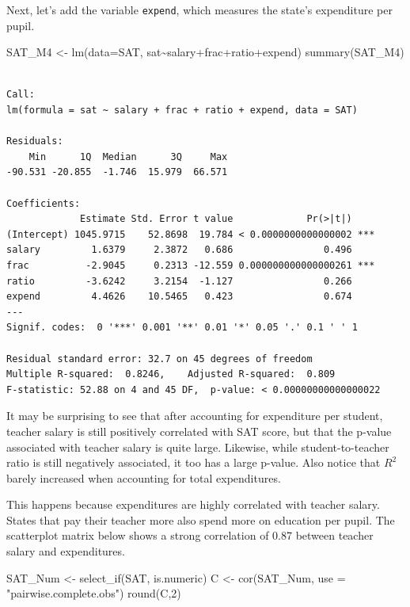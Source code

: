 \documentclass[
  letterpaper,
  DIV=11,
  numbers=noendperiod]{scrreprt}
\newenvironment{Shaded}{\begin{snugshade}}{\end{snugshade}}
\newcommand{\AttributeTok}[1]{\textcolor[rgb]{0.40,0.45,0.13}{#1}}
\newcommand{\DecValTok}[1]{\textcolor[rgb]{0.68,0.00,0.00}{#1}}
\newcommand{\FunctionTok}[1]{\textcolor[rgb]{0.28,0.35,0.67}{#1}}
\newcommand{\NormalTok}[1]{\textcolor[rgb]{0.00,0.23,0.31}{#1}}
\newcommand{\OtherTok}[1]{\textcolor[rgb]{0.00,0.23,0.31}{#1}}
\newcommand{\SpecialCharTok}[1]{\textcolor[rgb]{0.37,0.37,0.37}{#1}}
\newcommand{\StringTok}[1]{\textcolor[rgb]{0.13,0.47,0.30}{#1}}
\begin{document}
Next, let's add the variable \texttt{expend}, which measures the state's
expenditure per pupil.

\begin{Shaded}
\begin{Highlighting}[]
\NormalTok{SAT\_M4 }\OtherTok{\textless{}{-}} \FunctionTok{lm}\NormalTok{(}\AttributeTok{data=}\NormalTok{SAT, sat}\SpecialCharTok{\textasciitilde{}}\NormalTok{salary}\SpecialCharTok{+}\NormalTok{frac}\SpecialCharTok{+}\NormalTok{ratio}\SpecialCharTok{+}\NormalTok{expend)}
\FunctionTok{summary}\NormalTok{(SAT\_M4)}
\end{Highlighting}
\end{Shaded}

\begin{verbatim}

Call:
lm(formula = sat ~ salary + frac + ratio + expend, data = SAT)

Residuals:
    Min      1Q  Median      3Q     Max 
-90.531 -20.855  -1.746  15.979  66.571 

Coefficients:
             Estimate Std. Error t value             Pr(>|t|)    
(Intercept) 1045.9715    52.8698  19.784 < 0.0000000000000002 ***
salary         1.6379     2.3872   0.686                0.496    
frac          -2.9045     0.2313 -12.559 0.000000000000000261 ***
ratio         -3.6242     3.2154  -1.127                0.266    
expend         4.4626    10.5465   0.423                0.674    
---
Signif. codes:  0 '***' 0.001 '**' 0.01 '*' 0.05 '.' 0.1 ' ' 1

Residual standard error: 32.7 on 45 degrees of freedom
Multiple R-squared:  0.8246,    Adjusted R-squared:  0.809 
F-statistic: 52.88 on 4 and 45 DF,  p-value: < 0.00000000000000022
\end{verbatim}

It may be surprising to see that after accounting for expenditure per
student, teacher salary is still positively correlated with SAT score,
but that the p-value associated with teacher salary is quite large.
Likewise, while student-to-teacher ratio is still negatively associated,
it too has a large p-value. Also notice that \(R^2\) barely increased
when accounting for total expenditures.

This happens because expenditures are highly correlated with teacher
salary. States that pay their teacher more also spend more on education
per pupil. The scatterplot matrix below shows a strong correlation of
0.87 between teacher salary and expenditures.

\begin{Shaded}
\begin{Highlighting}[]
\NormalTok{SAT\_Num }\OtherTok{\textless{}{-}} \FunctionTok{select\_if}\NormalTok{(SAT, is.numeric)}
\NormalTok{C }\OtherTok{\textless{}{-}} \FunctionTok{cor}\NormalTok{(SAT\_Num, }\AttributeTok{use =} \StringTok{"pairwise.complete.obs"}\NormalTok{)}
\FunctionTok{round}\NormalTok{(C,}\DecValTok{2}\NormalTok{)}
\end{Highlighting}
\end{Shaded}
\end{document}
